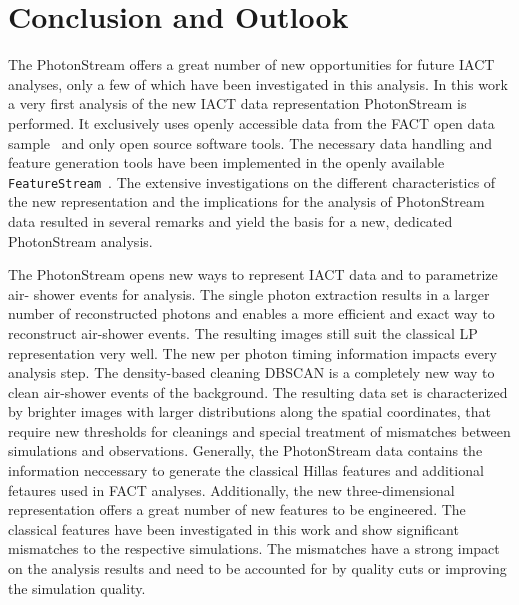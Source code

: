 \chapter{Conclusion and Outlook}\label{ch:summary}
%
The PhotonStream offers a great number of new opportunities for future IACT
analyses, only a few of which have been investigated in this analysis.
In this work a very first analysis of the new IACT data representation
PhotonStream is performed. It exclusively uses openly accessible data from the
FACT open data sample~\cite{fact-data} and only open source software tools. The
necessary data handling and feature generation tools have been implemented in
the openly available \texttt{FeatureStream}~\cite{FeatureStream}. The extensive
investigations on the different characteristics of the new representation and
the implications for the analysis of PhotonStream data resulted in several
remarks and yield the basis for a new, dedicated PhotonStream analysis.

The PhotonStream opens new ways to represent IACT data and to parametrize air-
shower events for analysis. The single photon extraction results in a larger
number of reconstructed photons and enables a more efficient and exact way to
reconstruct air-shower events. The resulting images still suit the classical LP
representation very well. The new per photon timing information impacts every
analysis step. The density-based cleaning DBSCAN is a completely new way to
clean air-shower events of the background. The resulting data set is
characterized by brighter images with larger distributions along the spatial
coordinates, that require new thresholds for cleanings and special treatment of mismatches between simulations and observations. Generally, the PhotonStream data contains the
information neccessary to generate the classical Hillas features and additional
fetaures used in FACT analyses. Additionally, the new three-dimensional
representation offers a great number of new features to be engineered. The
classical features have been investigated in this work and show significant
mismatches to the respective simulations. The mismatches have a strong impact
on the analysis results and need to be accounted for by quality cuts or
improving the simulation quality.

